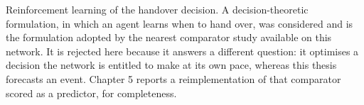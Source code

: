 Reinforcement learning of the handover decision. A decision-theoretic formulation, in which an agent learns when to hand over, was considered and is the formulation adopted by the nearest comparator study available on this network. It is rejected here because it answers a different question: it optimises a decision the network is entitled to make at its own pace, whereas this thesis forecasts an event. Chapter 5 reports a reimplementation of that comparator scored as a predictor, for completeness.

